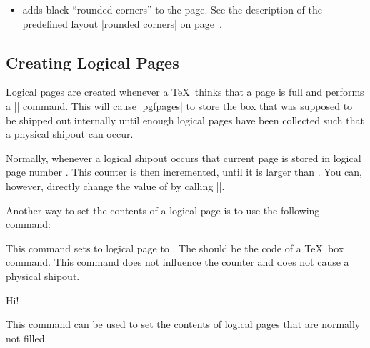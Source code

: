 \begin{command}{\pgfpageslogicalpageoptions{}}
\begin{itemize}
    You can also call |\pgfdiscardpath| and add your own path
    construction code (for example to paint a rectangle with rounded
    corners). The coordinate system is  setup in such a way that a
    rectangle starting at the origin and having the height and width
    of \TeX-box 0 will result in a rectangle filling exactly the
    logical page currently being put on the physical page. The logical
    page is inserted \emph{after} these commands have been executed.

    \example Add a rectangle around the page:
\begin{codeexample}
\end{codeexample}
  \item
    adds black ``rounded corners'' to the page. See the description of
    the predefined layout |rounded corners| on
    page~\pageref{layout-rounded-corners}.
  \end{itemize}
\end{command}




\subsection{Creating Logical Pages}

Logical pages are created whenever a \TeX\ thinks that a page is full
and performs a |\shipout| command. This will cause |pgfpages| to store
the box that was supposed to be shipped out internally until enough
logical pages have been collected such that a physical shipout can
occur.

Normally, whenever a logical shipout occurs that current page is
stored in logical page number . This
counter is then incremented, until it is larger than . You can, however, directly change the value of
 by calling |\pgfpagesphysicalpageoptions|.

Another way to set the contents of a logical page is to use the
following command:

\begin{command}{\pgfpagesshipoutlogicalpage{}}
  This command sets to logical page  to . The
   should be the code of a \TeX\ box command. This command
  does not influence the counter  and does
  not cause a physical shipout.

\begin{codeexample}
\vbox{Hi!}
\end{codeexample}

  This command can be used to set the contents of logical pages that
  are normally not filled.
\end{command}

